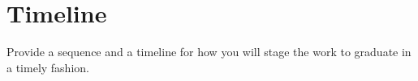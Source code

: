 \section{Timeline}
Provide a sequence and a timeline for how you will stage the work to graduate in a timely fashion.